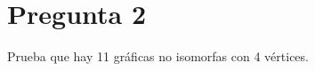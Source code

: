 \documentclass[12pt, fleqn]{article}                            %
\theoremstyle{break}                                            %
\begin{document}
\restoregeometry                                                    %
\nopagecolor                                                        %




\tableofcontents{}
\label{sec:Index}

\clearpage

\clearpage
\section{Pregunta 2}

    Prueba que hay 11 gráficas no isomorfas con 4 vértices.
\end{document}
